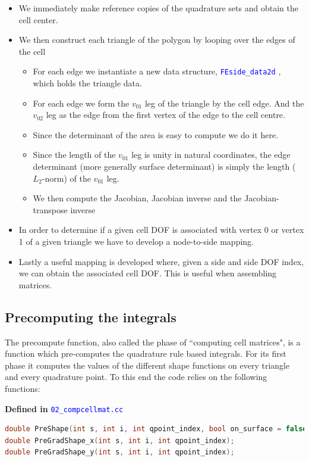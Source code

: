 \documentclass[11pt,letterpaper,titlepage]{article}
\newcommand{\xmltag}[1]{\textcolor{blue}{ \texttt{#1}} }
\begin{document}
\begin{itemize}
\item We immediately make reference copies of the quadrature sets and obtain the cell center.
\item We then construct each triangle of the polygon by looping over the edges of the cell
\begin{itemize}
\item For each edge we instantiate a new data structure, \xmltag{FEside\_data2d}, which holds the triangle data.
\item For each edge we form the $v_{01}$ leg of the triangle by the cell edge. And the $v_{02}$ leg as the edge from the first vertex of the edge to the cell centre.
\item Since the determinant of the area is easy to compute we do it here.
\item Since the length of the $v_{01}$ leg is unity in natural coordinates, the edge determinant (more generally surface determinant) is simply the length ($L_2$-norm) of the $v_{01}$ leg.
\item We then compute the Jacobian, Jacobian inverse and the Jacobian-transpose inverse
\end{itemize}
\item In order to determine if a given cell DOF is associated with vertex 0 or vertex 1 of a given triangle we have to develop a node-to-side mapping.
\item Lastly a useful mapping is developed where, given a side and side DOF index, we can obtain the associated cell DOF. This is useful when assembling matrices.
\end{itemize}



\vspace{0.5cm}
\subsection{Precomputing the integrals}
The precompute function, also called the phase of ``computing cell matrices", is a function which pre-computes the quadrature rule based integrals. For its first phase it computes the values of the different shape functions on every triangle and every quadrature point. To this end the code relies on the following functions:

\vspace{0.5cm}
\textbf{Defined in } \xmltag{02\_compcellmat.cc}
\begin{lstlisting}[language=c++]
double PreShape(int s, int i, int qpoint_index, bool on_surface = false);
double PreGradShape_x(int s, int i, int qpoint_index);
double PreGradShape_y(int s, int i, int qpoint_index);
\end{lstlisting}
\end{document}
